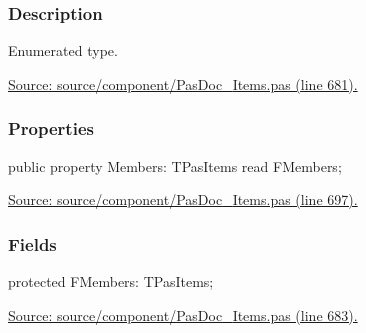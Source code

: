 \documentclass{report}
\newif\ifpdf
\begin{document}
\subsubsection*{\large{\textbf{Description}}\normalsize\hspace{1ex}\hfill}
Enumerated type.\par
\href{https://github.com/pasdoc/pasdoc/blob/master/source/component/PasDoc_Items.pas#L681}{Source: source/component/PasDoc{\_}Items.pas (line 681).}\subsubsection*{\large{\textbf{Properties}}\normalsize\hspace{1ex}\hfill}
\begin{list}{}{
\setlength{\itemindent}{0cm}
\setlength{\listparindent}{0cm}
\setlength{\leftmargin}{\evensidemargin}
\addtolength{\leftmargin}{\tmplength}
\settowidth{\labelsep}{X}
\addtolength{\leftmargin}{\labelsep}
\setlength{\labelwidth}{\tmplength}
}
\label{PasDoc_Items.TPasEnum-Members}
\item[\textbf{Members}\hfill]
\ifpdf
\begin{flushleft}
\fi
\begin{ttfamily}
public property Members: TPasItems read FMembers;\end{ttfamily}

\ifpdf
\end{flushleft}
\fi


\par  \par
\href{https://github.com/pasdoc/pasdoc/blob/master/source/component/PasDoc_Items.pas#L697}{Source: source/component/PasDoc{\_}Items.pas (line 697).}\end{list}
\subsubsection*{\large{\textbf{Fields}}\normalsize\hspace{1ex}\hfill}
\begin{list}{}{
\setlength{\itemindent}{0cm}
\setlength{\listparindent}{0cm}
\setlength{\leftmargin}{\evensidemargin}
\addtolength{\leftmargin}{\tmplength}
\settowidth{\labelsep}{X}
\addtolength{\leftmargin}{\labelsep}
\setlength{\labelwidth}{\tmplength}
}
\label{PasDoc_Items.TPasEnum-FMembers}
\item[\textbf{FMembers}\hfill]
\ifpdf
\begin{flushleft}
\fi
\begin{ttfamily}
protected FMembers: TPasItems;\end{ttfamily}

\ifpdf
\end{flushleft}
\fi


\par  \par
\href{https://github.com/pasdoc/pasdoc/blob/master/source/component/PasDoc_Items.pas#L683}{Source: source/component/PasDoc{\_}Items.pas (line 683).}\end{list}
\end{document}

